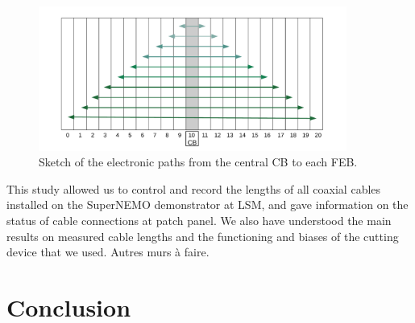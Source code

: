 \begin{figure}[h!]
  \centering
  \includegraphics[width=0.9\textwidth]{commissioning/fig_commissioning/clock_distribution_back_plain.pdf}
  \caption{Sketch of the electronic paths from the central CB to each FEB.
    \label{fig:attenuation}}
\end{figure}










This study allowed us to control and record the lengths of all coaxial cables installed on the SuperNEMO demonstrator at LSM, and gave information on the status of cable connections at patch panel.
We also have understood the main results on measured cable lengths and the functioning and biases of the cutting device that we used.
Autres murs à faire.


\section{Conclusion}
